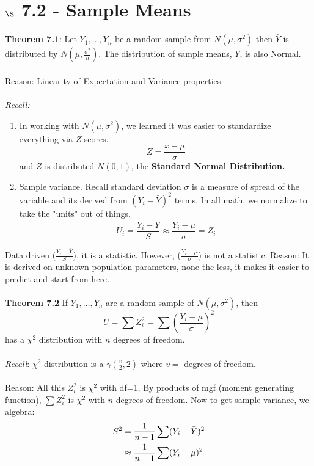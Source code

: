 \documentclass[12pt]{article}
\newcommand{\pars}[1]{\left( {#1} \right) }
\newcommand{\ybar}{\bar{Y}}
\newcommand{\N}[2]{N \left( {#1},{#2} \right)}
\newcommand{\gammaDist}[2]{\gamma \left( {#1},{#2} \right)}
\newcommand{\Ndef}{N\left(\mu, \sigma^2\right)} %
\newcommand{\yn}{Y_1, \dots, Y_n}
\begin{document}
\section*{$\S$ 7.2 - Sample Means}
\textbf{Theorem 7.1}: Let $\yn$ be a random sample from $\Ndef$ then $\ybar$ is distributed by $\N{\mu}{\frac{\sigma^2}{n}}$. The distribution of sample means, $\ybar$, is also Normal.
\\\\Reason: Linearity of Expectation and Variance properties
\\\\\emph{Recall:}
\begin{enumerate} %
        \item In working with $\Ndef$, we learned it was easier to standardize everything via
        $Z$-scores. $$Z = \frac{x-\mu}{\sigma}$$
        and $Z$ is distributed $\N{0}{1}$, the \textbf{Standard Normal Distribution.}
        
        \item Sample variance. Recall standard deviation $\sigma$ is a measure of spread of the variable and its derived from $\pars{Y_i - \ybar}^2$ terms.
 In all math, we normalize to take the "units" out of things.
 $$U_i = \frac{Y_i - \bar{Y}}{S} \approx \frac{Y_i - \mu}{\sigma} = Z_i$$
    \end{enumerate}
Data driven ($\frac{Y_i - \bar{Y}}{S}$), it is a statistic. However, ($\frac{Y_i - \mu}{\sigma}$) is not a statistic.
Reason: It is derived on unknown population parameters, none-the-less, it makes it easier to predict and start from here.
\\\\\textbf{Theorem 7.2} If $\yn$ are a random sample of $\Ndef$, then
$$U = \sum Z_i^2 = \sum \pars{\frac{Y_i - \mu}{\sigma}}^2$$
has a $\chi ^2$ distribution with $n$ degrees of freedom.
\\\\\textit{Recall}: $\chi^2$ distribution is a $\gammaDist{\frac{v}{2}}{2}$ where $v = $ degrees of freedom.
\\\\Reason: All this $Z_i^2$ is $\chi^2$ with df=1, 
By products of mgf (moment generating function), $\sum Z_i^2$ is $\chi^2$ with $n$ degrees of freedom.
Now to get sample variance, we algebra:
\begin{align}
        S^2 &= \frac{1}{n-1}\sum(Y_i-\bar{Y})^2 \notag\\
        & \approx \frac{1}{n-1}\sum(Y_i - \mu)^2 \notag
    \end{align}
\end{document}
